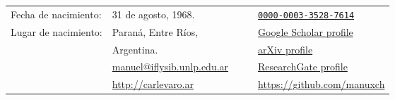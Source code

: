 %
%
\begin{center}
	\begin{tabular}{l l p{1cm} c l}
		Fecha de nacimiento:                                  & 31 de agosto, 1968.                                                  &  & \color{DimGrey}{\aiOrcid}         & \href{https://orcid.org/0000-0003-3528-7614}{\texttt{0000-0003-3528-7614}}                                          \\

		Lugar de nacimiento:                                  & Paraná, Entre Ríos,                                                  &  & \color{DimGrey}{\aiGoogleScholar} & \href{https://scholar.google.com.ar/citations?user=FoBqqJgAAAAJ                    & hl=en}{Google Scholar profile} \\
		                                                      & Argentina.                                                           &  & \color{DimGrey}{\aiarXiv}         & \href{https://arxiv.org/a/carlevaro_m_1.html}{arXiv profile}                                                        \\
		      & \href{mailto:manuel@iflysib.unlp.edu.ar}{manuel@iflysib.unlp.edu.ar} &  & \color{DimGrey}{\aiResearchGate}  & \href{https://www.researchgate.net/profile/Manuel-Carlevaro}{ResearchGate profile}                                  \\
		 & \href{http://carlevaro.ar}{http://carlevaro.ar}                      &  & \color{DimGrey}{\faGithub}        & \href{https://github.com/manuxch}{https://github.com/manuxch}
	\end{tabular}
\end{center}
